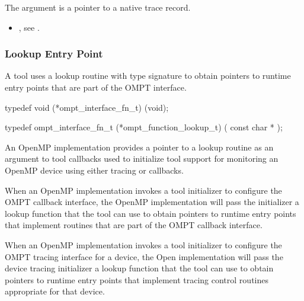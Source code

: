 \argdesc

The argument  is a pointer to a native trace
record.

\crossreferences
\begin{itemize}
\item {},
see .
\end{itemize}

\subsubsection{Lookup Entry Point}

\label{sec:ompt_function_lookup_t}
\label{sec:ompt_function_lookup}

\summary
A tool uses a lookup routine with type signature
to obtain pointers to runtime entry points that are
part of the OMPT interface.

\format

\begin{ccppspecific}
\begin{omptInquiry}
typedef void (*ompt_interface_fn_t) (void);

typedef ompt_interface_fn_t (*ompt_function_lookup_t) (
  const char *
);
\end{omptInquiry}
\end{ccppspecific}


\descr

An OpenMP implementation provides a pointer to a lookup routine as an
argument to tool callbacks used to initialize tool support for
monitoring an OpenMP device using either tracing or callbacks.



When an OpenMP implementation invokes a tool initializer to configure
the OMPT callback interface, the OpenMP implementation will pass the
initializer a lookup function that the tool can use to obtain
pointers to runtime entry points that implement routines that are part of
the OMPT callback interface.

When an OpenMP implementation invokes a tool initializer to configure
the OMPT tracing interface for a device, the Open implementation will
pass the device tracing initializer a lookup function that the tool
can use to obtain pointers to runtime entry points that implement
tracing control routines appropriate for that device.

